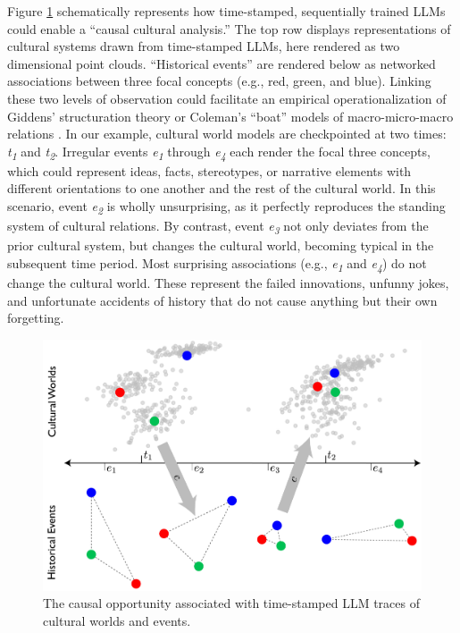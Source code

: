 \documentclass{article}
\begin{document}
Figure \ref{fig:future} schematically represents how time-stamped, sequentially
trained LLMs could enable a ``causal cultural analysis.'' The top row
displays representations of cultural systems drawn from time-stamped
LLMs, here rendered as two dimensional point clouds. ``Historical
events'' are rendered below as networked associations between three
focal concepts (e.g., red, green, and blue). Linking these two levels of
observation could facilitate an empirical operationalization of Giddens'
structuration theory \parencite{Giddens1984-vx} or Coleman's ``boat'' models of macro-micro-macro relations
\parencite{Coleman1994-ay}. In our
example, cultural world models are checkpointed at two times:
\emph{t\textsubscript{1}} and \emph{t\textsubscript{2}}. Irregular
events \emph{e\textsubscript{1}} through \emph{e\textsubscript{4}} each
render the focal three concepts, which could represent ideas, facts,
stereotypes, or narrative elements with different orientations to one
another and the rest of the cultural world. In this scenario, event
\emph{e\textsubscript{2}} is wholly unsurprising, as it perfectly
reproduces the standing system of cultural relations. By contrast, event
\emph{e\textsubscript{3 }}not only deviates from the prior cultural
system, but changes the cultural world, becoming typical in the
subsequent time period. Most surprising associations (e.g.,
\emph{e\textsubscript{1}} and \emph{e\textsubscript{4}}) do not change
the cultural world. These represent the failed innovations, unfunny
jokes, and unfortunate accidents of history that do not cause anything
but their own forgetting.

\begin{figure}[!hp]
  \captionsetup{justification=raggedright,singlelinecheck=false}
  \caption{The causal opportunity associated with time-stamped LLM traces of cultural worlds and events.}
  \label{fig:future}
  \centering
  \includegraphics[width=\textwidth]{./figures/media/image9.jpg}
\end{figure}
\end{document}
